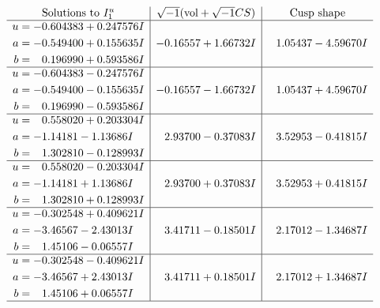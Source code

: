 \documentclass[1p]{elsarticle_modified}
\theoremstyle{definition}
\newcommand{\I}{\sqrt{-1}}
\begin{document}
$$\begin{array}{c|c|c}
\text{Solutions to }I^u_{1}& \I (\text{vol} + \sqrt{-1}CS) & \text{Cusp shape}\\
 \hline 
\begin{aligned}
u &= -0.604383 + 0.247576 I \\
a &= -0.549400 + 0.155635 I \\
b &= \phantom{-}0.196990 + 0.593586 I\end{aligned}
 & -0.16557 + 1.66732 I & \phantom{-}1.05437 - 4.59670 I \\ \hline\begin{aligned}
u &= -0.604383 - 0.247576 I \\
a &= -0.549400 - 0.155635 I \\
b &= \phantom{-}0.196990 - 0.593586 I\end{aligned}
 & -0.16557 - 1.66732 I & \phantom{-}1.05437 + 4.59670 I \\ \hline\begin{aligned}
u &= \phantom{-}0.558020 + 0.203304 I \\
a &= -1.14181 - 1.13686 I \\
b &= \phantom{-}1.302810 - 0.128993 I\end{aligned}
 & \phantom{-}2.93700 - 0.37083 I & \phantom{-}3.52953 - 0.41815 I \\ \hline\begin{aligned}
u &= \phantom{-}0.558020 - 0.203304 I \\
a &= -1.14181 + 1.13686 I \\
b &= \phantom{-}1.302810 + 0.128993 I\end{aligned}
 & \phantom{-}2.93700 + 0.37083 I & \phantom{-}3.52953 + 0.41815 I \\ \hline\begin{aligned}
u &= -0.302548 + 0.409621 I \\
a &= -3.46567 - 2.43013 I \\
b &= \phantom{-}1.45106 - 0.06557 I\end{aligned}
 & \phantom{-}3.41711 - 0.18501 I & \phantom{-}2.17012 - 1.34687 I \\ \hline\begin{aligned}
u &= -0.302548 - 0.409621 I \\
a &= -3.46567 + 2.43013 I \\
b &= \phantom{-}1.45106 + 0.06557 I\end{aligned}
 & \phantom{-}3.41711 + 0.18501 I & \phantom{-}2.17012 + 1.34687 I\\
 \hline 
 \end{array}$$\newpage\newpage\renewcommand{\arraystretch}{1}
\end{document}

